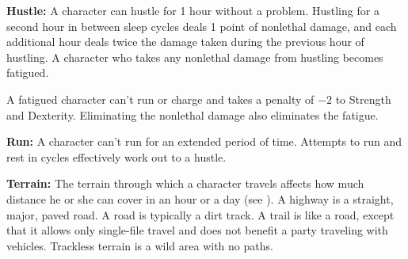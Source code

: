 \textbf{Hustle:} A character can hustle for 1 hour without a problem. Hustling for a second hour in between sleep cycles deals 1 point of nonlethal damage, and each additional hour deals twice the damage taken during the previous hour of hustling. A character who takes any nonlethal damage from hustling becomes fatigued.

A fatigued character can't run or charge and takes a penalty of $-2$ to Strength and Dexterity. Eliminating the nonlethal damage also eliminates the fatigue.

\textbf{Run:} A character can't run for an extended period of time. Attempts to run and rest in cycles effectively work out to a hustle.

\textbf{Terrain:} The terrain through which a character travels affects how much distance he or she can cover in an hour or a day (see ). A highway is a straight, major, paved road. A road is typically a dirt track. A trail is like a road, except that it allows only single-file travel and does not benefit a party traveling with vehicles. Trackless terrain is a wild area with no paths.

